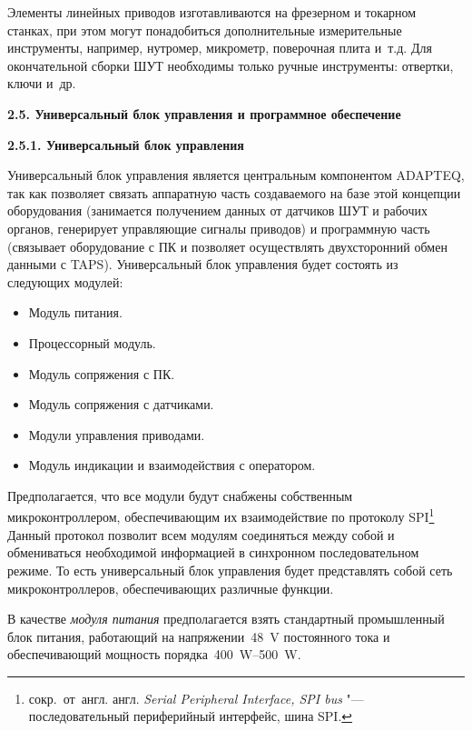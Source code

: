 Элементы линейных приводов изготавливаются на фрезерном и токарном станках, при этом могут понадобиться дополнительные измерительные инструменты, например, нутромер, микрометр, поверочная плита и~т.\:д. Для окончательной сборки ШУТ необходимы только ручные инструменты: отвертки, ключи и~др.

\textbf{2.5. Универсальный блок управления и программное обеспечение}

\textbf{2.5.1. Универсальный блок управления}

Универсальный блок управления является центральным компонентом \foreignlanguage{english}{ADAPTEQ}, так как позволяет связать аппаратную часть создаваемого на базе этой концепции оборудования (занимается получением данных от датчиков ШУТ и рабочих органов, генерирует управляющие сигналы приводов) и программную часть (связывает оборудование с ПК и позволяет осуществлять двухсторонний обмен данными с \foreignlanguage{english}{TAPS}). Универсальный блок управления будет состоять из следующих модулей:

\begin{itemize}
	\item Модуль питания.
	
	\item Процессорный модуль.
	
	\item Модуль сопряжения с ПК.
	
	\item Модуль сопряжения с датчиками.
	
	\item Модули управления приводами.
	
	\item Модуль индикации и взаимодействия с оператором.
\end{itemize}

Предполагается, что все модули будут снабжены собственным микроконтроллером, обеспечивающим их взаимодействие по протоколу \foreignlanguage{english}{SPI}\footnote{сокр.~от~англ. англ. \textit{Serial Peripheral Interface, SPI bus} "--- последовательный периферийный интерфейс, шина SPI.} Данный протокол позволит всем модулям соединяться между собой и обмениваться необходимой информацией в синхронном последовательном режиме. То есть универсальный блок управления будет представлять собой сеть микроконтроллеров, обеспечивающих различные функции.

В качестве \textit{модуля питания} предполагается взять стандартный промышленный блок питания, работающий на напряжении~\SI{48}{\volt} постоянного тока и обеспечивающий мощность порядка~\SIrange{400}{500}{\watt}.

